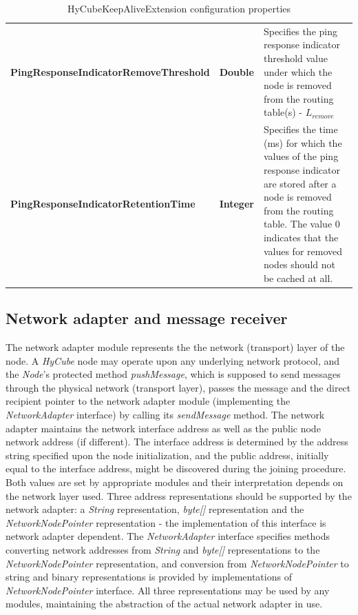 \begin{table}
\begin{center}
\begin{tabular}{p{5.5cm} p{1.0cm} p{8.0cm}}
	\textbf{PingResponseIndicatorRemoveThreshold}			& \textbf{Double}				& Specifies the ping response indicator threshold value under which the node is removed from the routing table(s) - $L_{remove}$		\\[1.5mm]	
	\textbf{PingResponseIndicatorRetentionTime}				& \textbf{Integer}				& Specifies the time (ms) for which the values of the ping response indicator are stored after a node is removed from the routing table. The value 0 indicates that the values for removed nodes should not be cached at all.		\\[1.5mm]	
    \hline
\end{tabular}
\end{center}
\caption{HyCubeKeepAliveExtension configuration properties}
\label{tab:libHyCubeKeepAliveExtension}
\end{table}









\subsection{Network adapter and message receiver}

The network adapter module represents the the network (transport) layer of the node. A \emph{HyCube} node may operate upon any underlying network protocol, and the \emph{Node}'s protected method \emph{pushMessage}, which is supposed to send messages through the physical network (transport layer), passes the message and the direct recipient pointer to the network adapter module (implementing the \emph{NetworkAdapter} interface) by calling its \emph{sendMessage} method. The network adapter maintains the network interface address as well as the public node network address (if different). The interface address is determined by the address string specified upon the node initialization, and the public address, initially equal to the interface address, might be discovered during the joining procedure. Both values are set by appropriate modules and their interpretation depends on the network layer used. Three address representations should be supported by the network adapter: a \emph{String} representation, \emph{byte[]} representation and the \emph{NetworkNodePointer} representation - the implementation of this interface is network adapter dependent. The \emph{NetworkAdapter} interface specifies methods converting network addresses from \emph{String} and \emph{byte[]} representations to the \emph{NetworkNodePointer} representation, and conversion from \emph{NetworkNodePointer} to string and binary representations is provided by implementations of \emph{NetworkNodePointer} interface. All three representations may be used by any modules, maintaining the abstraction of the actual network adapter in use.

